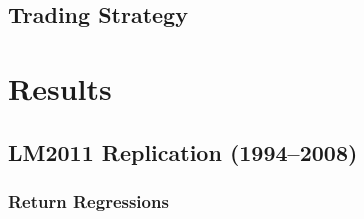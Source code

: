 \documentclass[12pt,a4paper,oneside]{report}
\begin{document}
\section{Trading Strategy}
\label{sec:trading_strategy}


\chapter{Results}
\label{ch:results}

\section{LM2011 Replication (1994--2008)}
\label{sec:replication_results}

\subsection{Return Regressions}
\label{sec:return_regressions}
\end{document}

